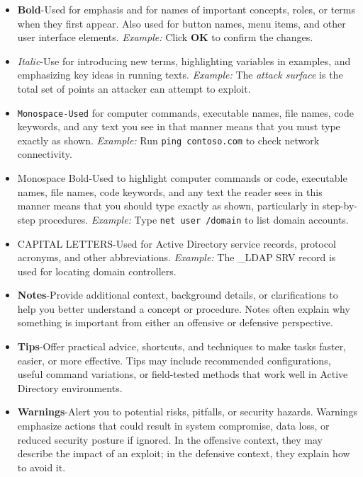 \begin{itemize}
    \item \textbf{Bold}-Used for emphasis and for names of important concepts, roles, or terms when they first appear. Also used for button names, menu items, and other user interface elements.
    \textit{Example:} Click \textbf{OK} to confirm the changes.
    \item \textit{Italic}-Use for introducing new terms, highlighting variables in examples, and emphasizing key ideas in running texts.
    \textit{Example:} The \textit{attack surface} is the total set of points an attacker can attempt to exploit.
    \item \colorbox{gray!20}{\texttt{Monospace-Used}} for computer commands, executable names, file names, code keywords, and any text you see in that manner means that you must type exactly as shown.
    \textit{Example:} Run \colorbox{gray!20}{\texttt{ping contoso.com}} to check network connectivity.
    \item Monospace Bold-Used to highlight computer commands or code, executable names, file names, code keywords, and any text the reader sees in this manner means that you should type exactly as shown, particularly in step-by-step procedures.
    \textit{Example:} Type \colorbox{gray!20}{\texttt{net user /domain}} to list domain accounts.
    \sloppy
    \item CAPITAL LETTERS-Used for Active Directory service records, protocol acronyms, and other abbreviations.
    \textit{Example:} The \_LDAP SRV record is used for locating domain controllers.
    \item \textbf{Notes}-Provide additional context, background details, or clarifications to help you better understand a concept or procedure. Notes often explain why something is important from either an offensive or defensive perspective.
    \item \textbf{Tips}-Offer practical advice, shortcuts, and techniques to make tasks faster, easier, or more effective. Tips may include recommended configurations, useful command variations, or field-tested methods that work well in Active Directory environments.
    \item \textbf{Warnings}-Alert you to potential risks, pitfalls, or security hazards. Warnings emphasize actions that could result in system compromise, data loss, or reduced security posture if ignored. In the offensive context, they may describe the impact of an exploit; in the defensive context, they explain how to avoid it.
\end{itemize}


